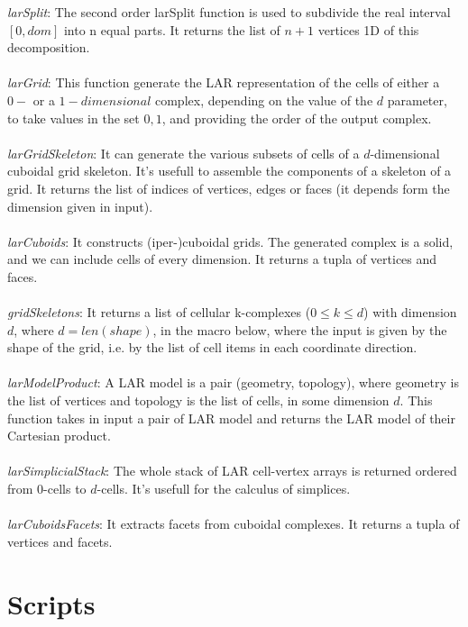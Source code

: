 \documentclass{article}
\begin{document}
\emph{larSplit}: The second order larSplit function is used to subdivide the real interval $[0, dom]$ into n equal parts. It returns the list of $n + 1$ vertices 1D of this decomposition.
\\ \\
\emph{larGrid}:  This function generate the LAR representation of the cells of either a $0-$ or a $1-dimensional$ complex, depending on the value of the $d$ parameter, to take values in the set ${0, 1}$, and providing the order of the output complex.
\\ \\
\emph{larGridSkeleton}: It can generate the various subsets of cells of a $d$-dimensional cuboidal grid skeleton.
It’s usefull to assemble the components of a skeleton of a grid. It returns the list of indices of vertices, edges or faces (it depends form the dimension given in input).
\\ \\
\emph{larCuboids}: It constructs (iper-)cuboidal grids. The generated complex is a solid, and we can include cells of every dimension. It returns a tupla of vertices and faces. 
\\ \\
\emph{gridSkeletons}: It returns a list of cellular k-complexes ($0 \leq k \leq d$) with dimension $d$, where $d = len(shape)$, in the macro below, where the input is given by the shape of the grid, i.e. by the list of cell items in each coordinate direction.
\\ \\
\emph{larModelProduct}: A LAR model is a pair (geometry, topology), where geometry is the list of vertices and topology is the list of cells, in some dimension $d$. This function takes in input a pair of LAR model and returns the LAR model of their Cartesian product.
\\ \\
\emph{larSimplicialStack}: The whole stack of LAR cell-vertex arrays is returned ordered from $0$-cells to $d$-cells.
It’s usefull for the calculus of simplices. 
\\ \\
\emph{larCuboidsFacets}: It extracts facets from cuboidal complexes. It returns a tupla of vertices and facets.


\section{Scripts}
\end{document}
